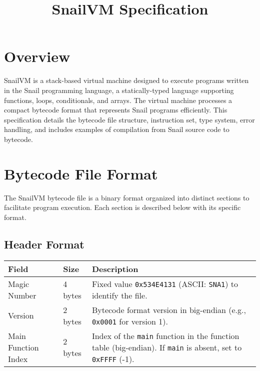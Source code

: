\documentclass[a4paper,12pt]{article}
\title{\textbf{SnailVM Specification}}
\author{}
\begin{document}
    \maketitle
    \tableofcontents
    \clearpage

    \section{Overview}
    SnailVM is a stack-based virtual machine designed to execute programs written in the Snail programming language, a statically-typed language supporting functions, loops, conditionals, and arrays. The virtual machine processes a compact bytecode format that represents Snail programs efficiently. This specification details the bytecode file structure, instruction set, type system, error handling, and includes examples of compilation from Snail source code to bytecode.

    \section{Bytecode File Format}
    The SnailVM bytecode file is a binary format organized into distinct sections to facilitate program execution. Each section is described below with its specific format.

    \subsection{Header Format}
    \begin{tabular}{|l|l|p{6cm}|}
        \hline
        \textbf{Field} & \textbf{Size} & \textbf{Description} \\ \hline
        Magic Number & 4 bytes & Fixed value \texttt{0x534E4131} (ASCII: \texttt{SNA1}) to identify the file. \\ \hline
        Version & 2 bytes & Bytecode format version in big-endian (e.g., \texttt{0x0001} for version 1). \\ \hline
        Main Function Index & 2 bytes & Index of the \texttt{main} function in the function table (big-endian). If \texttt{main} is absent, set to \texttt{0xFFFF} (-1). \\ \hline
    \end{tabular}
    \label{tab:header_format}
\end{document}
